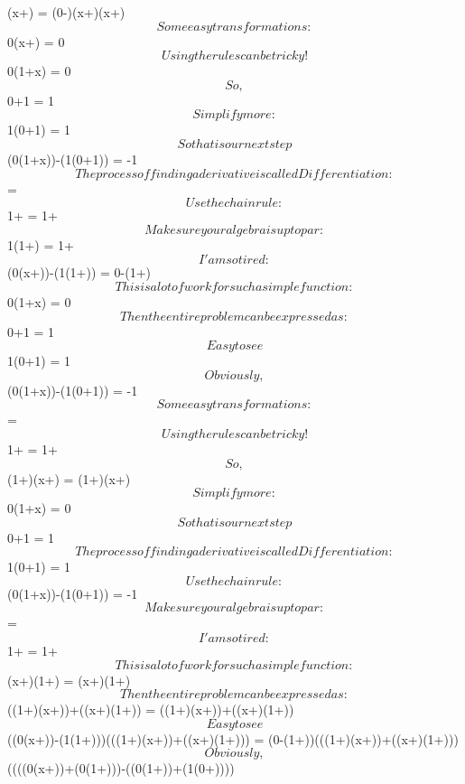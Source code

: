 \documentclass[12pt]{article}
\begin{document}
(x+) = (0-)\cdot (x+)\cdot (x+)$$Some easy transformations: $$0\cdot (x+) = 0$$Using the rules can be tricky!$$0\cdot (1+x) = 0$$So, $$0+1 = 1$$Simplify more: $$1\cdot (0+1) = 1$$So that is our next step$$(0\cdot (1+x))-(1\cdot (0+1)) = -1$$The process of finding a derivative is called Differentiation: $$ = $$Use the chain rule: $$1+ = 1+$$Make sure your algebra is up to par: $$1\cdot (1+) = 1+$$I'am so tired: $$(0\cdot (x+))-(1\cdot (1+)) = 0-(1+)$$This is a lot of work for such a simple function: $$0\cdot (1+x) = 0$$Then the entire problem can be expressed as: $$0+1 = 1$$Easy to see$$1\cdot (0+1) = 1$$Obviously, $$(0\cdot (1+x))-(1\cdot (0+1)) = -1$$Some easy transformations: $$ = $$Using the rules can be tricky!$$1+ = 1+$$So, $$(1+)\cdot (x+) = (1+)\cdot (x+)$$Simplify more: $$0\cdot (1+x) = 0$$So that is our next step$$0+1 = 1$$The process of finding a derivative is called Differentiation: $$1\cdot (0+1) = 1$$Use the chain rule: $$(0\cdot (1+x))-(1\cdot (0+1)) = -1$$Make sure your algebra is up to par: $$ = $$I'am so tired: $$1+ = 1+$$This is a lot of work for such a simple function: $$(x+)\cdot (1+) = (x+)\cdot (1+)$$Then the entire problem can be expressed as: $$((1+)\cdot (x+))+((x+)\cdot (1+)) = ((1+)\cdot (x+))+((x+)\cdot (1+))$$Easy to see$$((0\cdot (x+))-(1\cdot (1+)))\cdot (((1+)\cdot (x+))+((x+)\cdot (1+))) = (0-(1+))\cdot (((1+)\cdot (x+))+((x+)\cdot (1+)))$$Obviously, $$((((0\cdot (x+))+(0\cdot (1+)))-((0\cdot (1+))+(1\cdot (0+))))\cdot 
\end{document}
